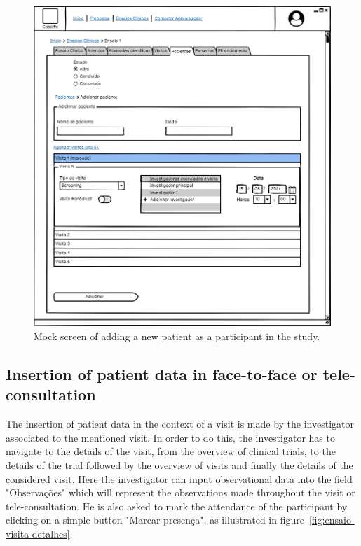 \begin{figure}[H]
    \centering
    \includegraphics[scale=0.35]{Chapters/img/ensaios/ensaio-adicionar-paciente.png}
    \caption{Mock screen of adding a new patient as a participant in the study.}
    \label{fig:ensaio-adicionar-paciente}
\end{figure}

\subsection{Insertion of patient data in face-to-face or tele-consultation}

The insertion of patient data in the context of a visit is made by the investigator associated to the mentioned visit. In order to do this, the investigator has to navigate to the details of the visit, from the overview of clinical trials, to the details of the trial followed by the overview of visits and finally the details of the considered visit. Here the investigator can input observational data into the field "Observações" which will represent the observations made throughout the visit or tele-consultation. He is also asked to mark the attendance of the participant by clicking on a simple button "Marcar presença", as illustrated in figure~\ref{fig:ensaio-visita-detalhes}.


